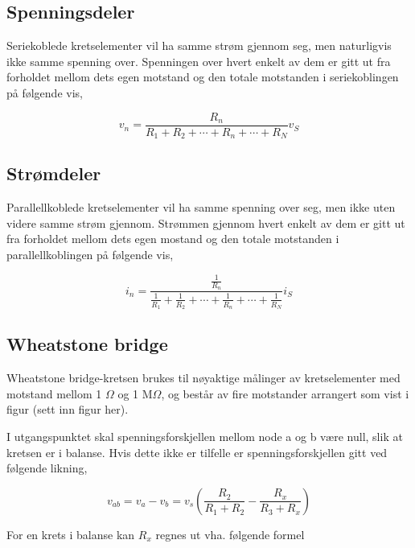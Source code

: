 \documentclass[norsk, a4paper, 12pt, twoside, titlepage]{article}
\begin{document}
\subsection{Spenningsdeler}
Seriekoblede kretselementer vil ha samme strøm gjennom seg, men
naturligvis ikke samme spenning over.  Spenningen over hvert enkelt av
dem er gitt ut fra forholdet mellom dets egen motstand og den totale
motstanden i seriekoblingen på følgende vis,

\begin{equation}
v_{n} = \frac{R_{n}}{R_{1} + R_{2} + \cdots + R_{n} + \cdots + R_{N}} v_{S}
\end{equation}


\subsection{Strømdeler}
Parallellkoblede kretselementer vil ha samme spenning over seg, men
ikke uten videre samme strøm gjennom.  Strømmen gjennom hvert enkelt
av dem er gitt ut fra forholdet mellom dets egen mostand og den totale
motstanden i parallellkoblingen på følgende vis,

\begin{equation}
i_{n} = \frac{\frac{1}{R_{n}}}{\frac{1}{R_{1}} + \frac{1}{R_{2}} + \cdots + \frac{1}{R_{n}} + \cdots + \frac{1}{R_{N}}} i_{S}
\end{equation}


\subsection{Wheatstone bridge}
Wheatstone bridge-kretsen brukes til nøyaktige målinger av
kretselementer med motstand mellom 1 $\Omega$ og 1 M$\Omega$, og
består av fire motstander arrangert som vist i figur (sett inn figur
her).

I utgangspunktet skal spenningsforskjellen mellom node a og b være
null, slik at kretsen er i balanse.  Hvis dette ikke er tilfelle er
spenningsforskjellen gitt ved følgende likning,

\begin{equation}
v_{ab} = v_{a} - v_{b} = v_{s} \left(\frac{R_{2}}{R_{1} + R_{2}} -
\frac{R_{x}}{R_{3} + R_{x}}\right)
\end{equation}

For en krets i balanse kan $R_{x}$ regnes ut vha. følgende formel
\end{document}
